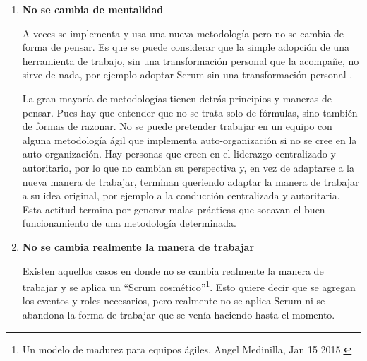 \begin{enumerate}
Desde esta perspectiva, hay que tener en cuenta que el uso de post-its y gráficos bosquejos que parecen infantiles no debería reemplazar el uso de herramientas conceptuales de diagramación como son: Unified Modeling Language, Architecture Description Language, Business Process Modeling Notation, Conceptual Diagram or ConceptDraw, Causal Loop Diagram, Entity Relationship Diagram, Flow Charts (para control de flujo), Data Flow Diagram, Structure Chart, Stock and Flow Diagrams, Structured Systems Analysis and Design Method, Map Mind Diagram, etc. El uso de dinámicas y conversaciones tampoco debería sustituir el Análisis de Sistemas, Investigación Operativa y las prácticas profesionales\footnote{\cite{SWEBOKv3-2014}} de Ingeniería de software; y la simplicidad no debería desplazar el uso de herramientas de software ni la eliminación de métricas fundamentales. La Ingeniería del Software intenta dar un marco de trabajo en el que se aplican práctica del conocimiento científico en el diseño y construcción de software con mayor calidad. 


\item \textbf{No se cambia de mentalidad}

A veces se implementa y usa una nueva metodología pero no se cambia de forma de pensar. Es que se puede considerar que la simple adopción de una herramienta de trabajo, sin una transformación personal que la acompañe, no sirve de nada, por ejemplo adoptar Scrum sin una transformación personal \cite{Martin-Alaimo-Kleer-2014}. 

La gran mayoría de metodologías tienen detrás principios y maneras de pensar. Pues hay que entender que no se trata solo de fórmulas, sino también de formas de razonar. No se puede pretender trabajar en un equipo con alguna metodología ágil que implementa auto-organización si no se cree en la auto-organización. Hay personas que creen en el liderazgo centralizado y autoritario, por lo que no cambian su perspectiva y, en vez de adaptarse a la nueva manera de trabajar, terminan queriendo adaptar la manera de trabajar a su idea original, por ejemplo a la conducción centralizada y autoritaria. Esta actitud termina por generar malas prácticas que socavan el buen funcionamiento de una metodología determinada.

\item \textbf{No se cambia realmente la manera de trabajar}

Existen aquellos casos en donde no se cambia realmente la manera de trabajar y se aplica un “Scrum cosmético”\footnote{Un modelo de madurez para equipos ágiles, Angel Medinilla, Jan 15 2015.}. Esto quiere decir que se agregan los eventos y roles necesarios, pero realmente no se aplica Scrum ni se abandona la forma de trabajar que se venía haciendo hasta el momento.


\end{enumerate}
